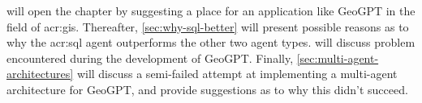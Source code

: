 \begin{comment}

In this section it is important to include a discussion of not just the merits of the work conducted, but also the limitations.
Which choices did you make? Why? What alternatives were there?
{\color{red}\textbf{Note that a key part of the Master's Thesis grading is based on the student's ability to discuss the results in light of the work by others as well as the restrictions and potential of the work itself.}}
While the Results section will report the outcome of each specific experiments, the Discussion should put those results into perspective and look at overall lessons that can be learned from the entire series of experiments.

You should be able to discuss your work in relation to its overall goal and your research questions (i.e., those introduced in Chapter~\ref{cha:introduction}),
but also address issues such as any ethical considerations that the work may entail,
as well as its technical challenges and limitations.

Discussion and evaluation can either be two different chapters, a joint chapter (as here), or part of the concluding chapter
--- or the discussion can be part of that chapter while the evaluation is part of the experimental chapter.

As for most parts of the thesis, it is possible to select various outlines and setups for the discussion; the important thing is that all the relevant parts appear \textit{somewhere\/} in the text.
\end{comment}

 will open the  chapter by suggesting a place for an application like GeoGPT in the field of \acrshort{acr:gis}. Thereafter, \autoref{sec:why-sql-better} will present possible reasons as to why the \acrshort{acr:sql} agent outperforms the other two agent types.  will discuss problem encountered during the development of GeoGPT. Finally, \autoref{sec:multi-agent-architectures} will discuss a semi-failed attempt at implementing a multi-agent architecture for GeoGPT, and provide suggestions as to why this didn't succeed.



